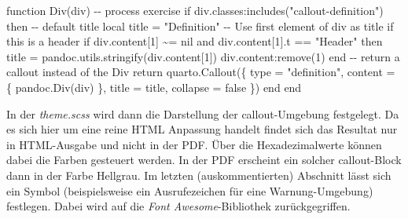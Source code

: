 \documentclass[
  letterpaper,
  DIV=11]{scrartcl}
\newenvironment{Shaded}{\begin{snugshade}}{\end{snugshade}}
\newcommand{\CommentTok}[1]{\textcolor[rgb]{0.37,0.37,0.37}{#1}}
\newcommand{\ControlFlowTok}[1]{\textcolor[rgb]{0.00,0.23,0.31}{#1}}
\newcommand{\DecValTok}[1]{\textcolor[rgb]{0.68,0.00,0.00}{#1}}
\newcommand{\FunctionTok}[1]{\textcolor[rgb]{0.28,0.35,0.67}{#1}}
\newcommand{\KeywordTok}[1]{\textcolor[rgb]{0.00,0.23,0.31}{#1}}
\newcommand{\NormalTok}[1]{\textcolor[rgb]{0.00,0.23,0.31}{#1}}
\newcommand{\OperatorTok}[1]{\textcolor[rgb]{0.37,0.37,0.37}{#1}}
\newcommand{\StringTok}[1]{\textcolor[rgb]{0.13,0.47,0.30}{#1}}
\newcommand{\VariableTok}[1]{\textcolor[rgb]{0.07,0.07,0.07}{#1}}
\begin{document}
\begin{Shaded}
\begin{Highlighting}[]
\KeywordTok{function}\NormalTok{ Div}\OperatorTok{(}\VariableTok{div}\OperatorTok{)}
  \CommentTok{{-}{-} process exercise}
  \ControlFlowTok{if} \VariableTok{div}\OperatorTok{.}\VariableTok{classes}\OperatorTok{:}\NormalTok{includes}\OperatorTok{(}\StringTok{"callout{-}definition"}\OperatorTok{)} \ControlFlowTok{then}
    \CommentTok{{-}{-} default title}
    \KeywordTok{local} \VariableTok{title} \OperatorTok{=} \StringTok{"Definition"}
    \CommentTok{{-}{-} Use first element of div as title if this is a header}
    \ControlFlowTok{if} \VariableTok{div}\OperatorTok{.}\VariableTok{content}\OperatorTok{[}\DecValTok{1}\OperatorTok{]} \OperatorTok{\textasciitilde{}=} \KeywordTok{nil} \KeywordTok{and} \VariableTok{div}\OperatorTok{.}\VariableTok{content}\OperatorTok{[}\DecValTok{1}\OperatorTok{].}\VariableTok{t} \OperatorTok{==} \StringTok{"Header"} \ControlFlowTok{then}
      \VariableTok{title} \OperatorTok{=} \VariableTok{pandoc}\OperatorTok{.}\VariableTok{utils}\OperatorTok{.}\NormalTok{stringify}\OperatorTok{(}\VariableTok{div}\OperatorTok{.}\VariableTok{content}\OperatorTok{[}\DecValTok{1}\OperatorTok{])}
      \VariableTok{div}\OperatorTok{.}\VariableTok{content}\OperatorTok{:}\FunctionTok{remove}\OperatorTok{(}\DecValTok{1}\OperatorTok{)}
    \ControlFlowTok{end}
    \CommentTok{{-}{-} return a callout instead of the Div}
    \ControlFlowTok{return} \VariableTok{quarto}\OperatorTok{.}\NormalTok{Callout}\OperatorTok{(\{}
      \FunctionTok{type} \OperatorTok{=} \StringTok{"definition"}\OperatorTok{,}
      \VariableTok{content} \OperatorTok{=} \OperatorTok{\{} \VariableTok{pandoc}\OperatorTok{.}\NormalTok{Div}\OperatorTok{(}\VariableTok{div}\OperatorTok{)} \OperatorTok{\},}
      \VariableTok{title} \OperatorTok{=} \VariableTok{title}\OperatorTok{,}
      \VariableTok{collapse} \OperatorTok{=} \KeywordTok{false}
    \OperatorTok{\})}
  \ControlFlowTok{end}
\KeywordTok{end}
\end{Highlighting}
\end{Shaded}

In der \emph{theme.scss} wird dann die Darstellung der callout-Umgebung
festgelegt. Da es sich hier um eine reine HTML Anpassung handelt findet
sich das Resultat nur in HTML-Ausgabe und nicht in der PDF. Über die
Hexadezimalwerte können dabei die Farben gesteuert werden. In der PDF
erscheint ein solcher callout-Block dann in der Farbe Hellgrau. Im
letzten (auskommentierten) Abschnitt lässt sich ein Symbol
(beispielsweise ein Ausrufezeichen für eine Warnung-Umgebung) festlegen.
Dabei wird auf die \emph{Font Awesome}-Bibliothek zurückgegriffen.
\end{document}
